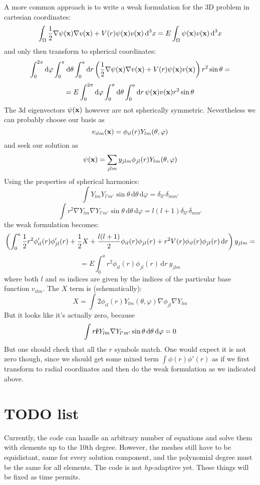 \documentclass[12pt]{article}
\def\d{\mbox{d}}
\begin{document}
A more common approach is to write a weak formulation for
the 3D problem in cartesian coordinates:
$$
\int_\Omega{1\over2}\nabla\psi({\bf x})\nabla v({\bf x})+V(r)\psi({\bf x})v({\bf
x})\,\d^3 x
=E\int_\Omega\psi({\bf x})v({\bf x})\,\d^3 x
$$
and only then transform to spherical coordinates:
$$
\int_0^{2\pi}\d\varphi\int_0^\pi\d\theta\int_0^a\d r
\left({1\over2}\nabla\psi({\bf x})\nabla v({\bf x})+V(r)\psi({\bf
x})v({\bf x})\right)r^2\sin\theta=
$$
$$
=
E\int_0^{2\pi}\d\varphi\int_0^\pi\d\theta\int_0^a\d r\,
\psi({\bf x})v({\bf x})r^2\sin\theta
$$
The 3d eigenvectors $\psi({\bf x})$ however are not spherically symmetric.
Nevertheless we can probably choose our basis as
$$v_{ilm}({\bf x})=\phi_{il}(r)Y_{lm}(\theta, \varphi)$$
and seek our solution as
$$\psi({\bf x})=\sum_{jlm}y_{jlm}\phi_{jl}(r)Y_{lm}(\theta, \varphi)$$
Using the properties of spherical harmonics:
$$\int Y_{lm} Y_{l'm'} \sin\theta\,\d\theta\,\d\varphi=
\delta_{ll'}\delta_{mm'}$$
$$\int r^2\nabla Y_{lm} \nabla Y_{l'm'} \sin\theta\,\d\theta\,\d\varphi=
l(l+1)\delta_{ll'}\delta_{mm'}$$
the weak formulation becomes:
$$
\left(\int_0^a
{1\over2}r^2\phi_{il}'(r)\phi_{jl}'(r)+
{1\over2}X+
{l(l+1)\over2}\phi_{il}(r)\phi_{jl}(r)+
r^2V(r)\phi_{il}(r)\phi_{jl}(r)\,\d r\right)y_{jlm}=
$$
$$ = E\int_0^ar^2 \phi_{il}(r)\phi_{jl}(r)\,\d r\ y_{jlm} $$
where both $l$ and $m$ indices are given by the indices of the particular base
function $v_{ilm}$. The $X$ term is (schematically):
$$X=\int 2 \phi_{il}(r)Y_{lm}(\theta,\varphi)\nabla\phi_{jl}\nabla Y_{lm}$$
But it looks like it's actually zero, because
$$\int r{\bf \hat r} Y_{lm} \nabla Y_{l'm'} \sin\theta\,\d\theta\,\d\varphi=
0$$
But one should check that all the $r$ symbols match. One would expect it is not
zero though, since we should get some mixed term $\int\phi(r) \phi'(r)$ as if we
first transform to radial coordinates and then do the weak formulation as we
indicated above.


\section{TODO list}

Currently, the code can handle an arbitrary number of equations and solve them
with elements up to the 10th degree. However, the meshes still have to be
equidistant, same for every solution component, and the polynomial degree must
be the same for all elements. The code is not $hp$-adaptive yet. These things
will be fixed as time permits.
\end{document}
